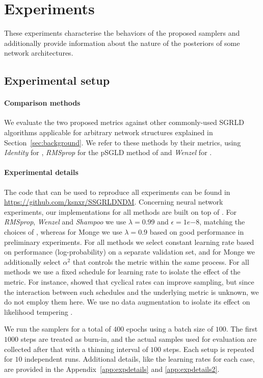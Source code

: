 \documentclass[10pt]{article} %
\theoremstyle{plain}
\theoremstyle{definition}
\theoremstyle{remark}
\begin{document}
\section{Experiments}

These experiments characterise the behaviors of the proposed samplers and additionally provide information about the nature of the posteriors  of some network architectures.

\subsection{Experimental setup}

\paragraph{Comparison methods}
We evaluate the two proposed metrics against other commonly-used SGRLD algorithms applicable for arbitrary network structures explained in Section~\ref{sec:background}. We refer to these methods by their metrics, using \emph{Identity} for \citet{Welling2011}, \emph{RMSprop} for the pSGLD method of \citet{Li2016} and \emph{Wenzel} for \citet{Wenzel2020}.

\paragraph{Experimental details}
The code that can be used to reproduce all experiments can be found in \url{https://github.com/ksnxr/SSGRLDNDM}. Concerning neural network experiments, our implementations for all methods are built on top of \citet{Fortuin2021}. For \emph{RMSprop}, \emph{Wenzel} and \emph{Shampoo} we use $\lambda=0.99$ and $\epsilon=1e{-8}$, matching the choices of \citet{Fortuin2022}, whereas for Monge we use $\lambda=0.9$ based on good performance in preliminary experiments. For all methods we select constant learning rate based on performance (log-probability) on a separate validation set, and for Monge we additionally select $\alpha^{2}$ that controls the metric within the same process.
For all methods we use a fixed schedule for learning rate to isolate the effect of the metric.
For instance, \citet{Zhang2020} showed that cyclical rates can improve sampling, but since the interaction between such schedules and the underlying metric is unknown, we do not employ them here. We use no data augmentation to isolate its effect on likelihood tempering \citep{Kapoor2022}.

We run the samplers for a total of $400$ epochs using a batch size of $100$.
The first $1000$ steps are treated as burn-in, and the actual samples used for evaluation are collected after that with a thinning interval of $100$ steps. Each setup is repeated for $10$ independent runs. Additional details, like the learning rates for each case, are provided in the Appendix~\ref{app:expdetails} and \ref{app:expdetails2}.
\end{document}
